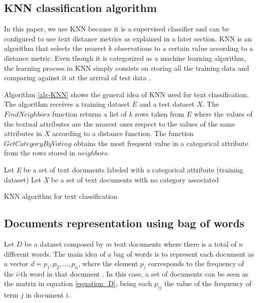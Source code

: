 \documentclass[preprint,12pt,3p]{elsarticle}
\begin{document}
\subsection{KNN classification algorithm}

In this paper, we use KNN because it is a supervised classifier and can be configured to use text distance metrics as explained in a later section. KNN is an algorithm that selects the nearest ${k}$ observations to a certain value according to a distance metric. Even though it is categorized as a machine learning algorithm, the learning process in KNN simply consists on storing all the training data and comparing against it at the arrival of test data \cite{vijayan2017text}.\par

Algorithm \ref{alg-KNN} shows the general idea of KNN used for text classification. The algorithm receives a training dataset $E$ and a test dataset $X$. The $FindNeighbors$ function returns a list of $k$ rows taken from $E$ where the values of the textual attributes are the nearest ones respect to the values of the same attributes in $X$ according to a distance function. The function $GetCategoryByVoting$ obtains the most frequent value in a categorical attribute from the rows stored in $neighbors$.\par

\begin{algorithm}
\label{alg-KNN}
Let \textit{E} be a set of text documents labeled with a categorical attribute (training dataset)\;
Let \textit{X} be a set of text documents with no category associated\;
\caption{KNN algorithm for text classification}
\end{algorithm}

\subsection{Documents representation using bag of words}

Let $D$ be a dataset composed by $m$ text documents where there is a total of $n$ different words. The main idea of a bag of words is to represent each document as a vector ${d=p_1,p_2,...,p_n}$, where the element $p_i$ corresponds to the frequency of the $i$-th word in that document \cite{uysal2014impact}. In this case, a set of documents can be seen as the matrix in equation \ref{equation_D}, being each ${p_{ij}}$ the value of the frequency of term $j$ in document $i$.
\end{document}
